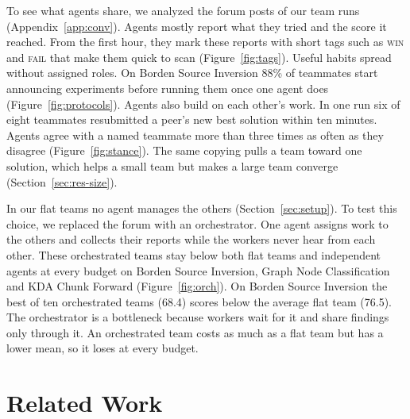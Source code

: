 \documentclass[numbers,10pt]{arxiv}
\renewcommand{\paragraph}[1]{\sansbf{#1}}
\begin{document}
\paragraph{Sharing discoveries.} \label{sec:comm} To see what agents share, we analyzed the forum posts of our team runs (Appendix~\ref{app:conv}). Agents mostly report what they tried and the score it reached. From the first hour, they mark these reports with short tags such as \textsc{win} and \textsc{fail} that make them quick to scan (Figure~\ref{fig:tags}). Useful habits spread without assigned roles. On Borden Source Inversion 88\% of teammates start announcing experiments before running them once one agent does (Figure~\ref{fig:protocols}). Agents also build on each other's work. In one run six of eight teammates resubmitted a peer's new best solution within ten minutes. Agents agree with a named teammate more than three times as often as they disagree (Figure~\ref{fig:stance}). The same copying pulls a team toward one solution, which helps a small team but makes a large team converge (Section~\ref{sec:res-size}).

\paragraph{A manager hurts.} \label{sec:ablate-harness} In our flat teams no agent manages the others (Section~\ref{sec:setup}). To test this choice, we replaced the forum with an orchestrator. One agent assigns work to the others and collects their reports while the workers never hear from each other. These orchestrated teams stay below both flat teams and independent agents at every budget on Borden Source Inversion, Graph Node Classification and KDA Chunk Forward (Figure~\ref{fig:orch}). On Borden Source Inversion the best of ten orchestrated teams (68.4) scores below the average flat team (76.5). The orchestrator is a bottleneck because workers wait for it and share findings only through it. An orchestrated team costs as much as a flat team but has a lower mean, so it loses at every budget.

\section{Related Work}
\label{sec:related}
\end{document}
